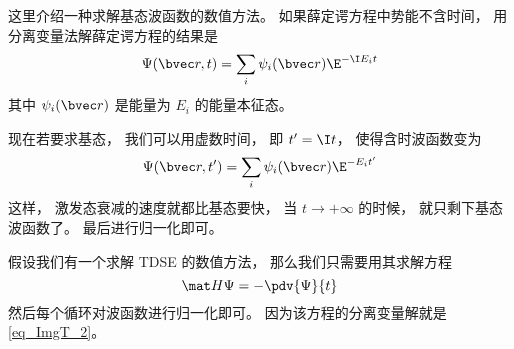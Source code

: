
\begin{issues}
\issueDraft
\end{issues}

这里介绍一种求解基态波函数的数值方法。 如果薛定谔方程中势能不含时间， 用分离变量法解薛定谔方程的结果是
\begin{equation}
\Psi(\bvec r, t) = \sum_i \psi_i(\bvec r) \E^{-\I E_i t}
\end{equation}
其中 $\psi_i(\bvec r)$ 是能量为 $E_i$ 的能量本征态。

现在若要求基态， 我们可以用虚数时间， 即 $t' = \I t$， 使得含时波函数变为
\begin{equation}\label{eq_ImgT_2}
\Psi(\bvec r, t') = \sum_i \psi_i(\bvec r) \E^{- E_i t'}
\end{equation}
这样， 激发态衰减的速度就都比基态要快， 当 $t \to +\infty$ 的时候， 就只剩下基态波函数了。 最后进行归一化即可。

假设我们有一个求解 TDSE 的数值方法， 那么我们只需要用其求解方程
\begin{equation}
\mat H\Psi = -\pdv{\Psi}{t}
\end{equation}
然后每个循环对波函数进行归一化即可。 因为该方程的分离变量解就是\autoref{eq_ImgT_2}。
